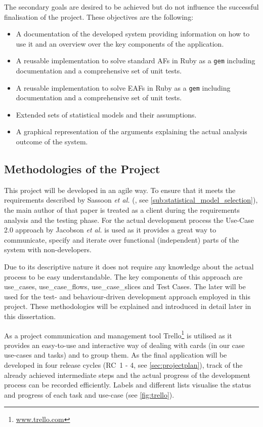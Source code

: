The secondary goals are desired to be achieved but do not influence the successful finalisation of the project. These objectives are the following:
\begin{itemize}
	\item A documentation of the developed system providing information on how to use it and an overview over the key components of the application.
	\item A reusable implementation to solve standard \glspl{AF} in Ruby as a \texttt{gem} including documentation and a comprehensive set of unit tests.
	\item A reusable implementation to solve \glspl{EAF} in Ruby as a \texttt{gem} including documentation and a comprehensive set of unit tests.
	\item Extended sets of statistical models and their assumptions.
	\item A graphical representation of the arguments explaining the actual analysis outcome of the system.
\end{itemize}


\subsection{Methodologies of the Project}
\label{sub:methodologies}
This project will be developed in an agile way. To ensure that it meets the requirements described by Sassoon \textit{et al.} (\cite{sassoon2014, sassoon2016, sassoon2016CD}, see \autoref{sub:statistical_model_selection}), the main author of that paper is treated as a client during the requirements analysis and the testing phase. For the actual development process the Use-Case 2.0 approach by Jacobson \textit{et al.} \cite{jacobson2011usecase} is used as it provides a great way to communicate, specify and iterate over functional (independent) parts of the system with non-developers. 

Due to its descriptive nature it does not require any knowledge about the actual process to be easy understandable. The key components of this approach are \glspl{use_case}, \glspl{use_case_flow}, \glspl{use_case_slice} and Test Cases. The later will be used for the test- and behaviour-driven development approach employed in this project. These methodologies will be explained and introduced in detail later in this dissertation. 

As a project communication and management tool Trello\footnote{\href{http://www.trello.com}{www.trello.com}} is utilised as it provides an easy-to-use and interactive way of dealing with cards (in our case use-cases and tasks) and to group them. As the final application will be developed in four release cycles (RC~1 - 4, see \autoref{sec:projectplan}), track of the already achieved intermediate steps and the actual progress of the development process can be recorded efficiently. Labels and different lists visualise the status and progress of each task and use-case (see \autoref{fig:trello}).



